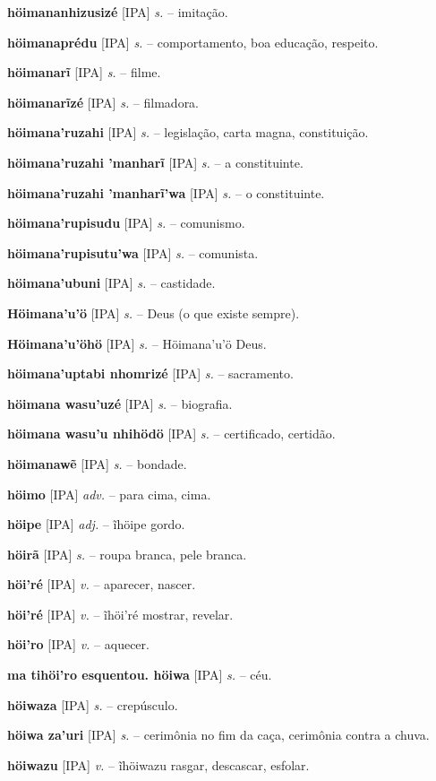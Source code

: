 \textbf{höimananhizusizé} [IPA] \textit{s.} -- imitação.

\textbf{höimanaprédu} [IPA] \textit{s.} -- comportamento, boa educação, respeito.

\textbf{höimanarĩ} [IPA] \textit{s.} -- filme.

\textbf{höimanarĩzé} [IPA] \textit{s.} -- filmadora.

\textbf{höimana'ruzahi} [IPA] \textit{s.} -- legislação, carta magna, constituição.

\textbf{höimana'ruzahi 'manharĩ} [IPA] \textit{s.} -- a constituinte.

\textbf{höimana'ruzahi 'manharĩ'wa} [IPA] \textit{s.} -- o constituinte.

\textbf{höimana'rupisudu} [IPA] \textit{s.} -- comunismo.

\textbf{höimana'rupisutu'wa} [IPA] \textit{s.} -- comunista.

\textbf{höimana'ubuni} [IPA] \textit{s.} -- castidade.

\textbf{Höimana'u'ö} [IPA] \textit{s.} -- Deus (o que existe sempre).

\textbf{Höimana'u'öhö} [IPA] \textit{s.} -- Höimana'u'ö Deus.

\textbf{höimana'uptabi nhomrizé} [IPA] \textit{s.} -- sacramento.

\textbf{höimana wasu'uzé} [IPA] \textit{s.} -- biografia.

\textbf{höimana wasu'u nhihödö} [IPA] \textit{s.} -- certificado, certidão.

\textbf{höimanawẽ} [IPA] \textit{s.} -- bondade.

\textbf{höimo} [IPA] \textit{adv.} -- para cima, cima.

\textbf{höipe} [IPA] \textit{adj.} -- ĩhöipe gordo.

\textbf{höirã} [IPA] \textit{s.} -- roupa branca, pele branca.

\textbf{höi'ré} [IPA] \textit{v.} -- aparecer, nascer.

\textbf{höi'ré} [IPA] \textit{v.} -- ĩhöi'ré mostrar, revelar.

\textbf{höi'ro} [IPA] \textit{v.} -- aquecer.

\textbf{ma tihöi'ro esquentou. höiwa} [IPA] \textit{s.} -- céu.

\textbf{höiwaza} [IPA] \textit{s.} -- crepúsculo.

\textbf{höiwa za'uri} [IPA] \textit{s.} -- cerimônia no fim da caça, cerimônia contra a chuva.

\textbf{höiwazu} [IPA] \textit{v.} -- ĩhöiwazu rasgar, descascar, esfolar.

